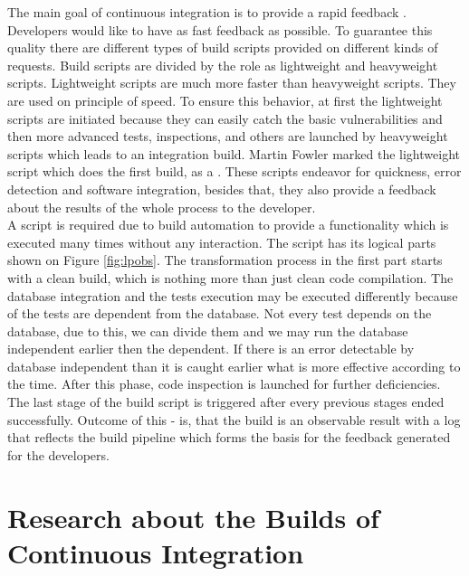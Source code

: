 The main goal of continuous integration is to provide a rapid feedback \cite{MartinFowler}. Developers would like to have as fast feedback as possible. To guarantee this quality there are different types of build scripts provided on different kinds of requests. Build scripts are divided by the role as lightweight and heavyweight scripts. Lightweight scripts are much more faster than heavyweight scripts. They are used on principle of speed. To ensure this behavior, at first the lightweight scripts are initiated because they can easily catch the basic vulnerabilities and then more advanced tests, inspections, and others are launched by heavyweight scripts which leads to an integration build. Martin Fowler marked the lightweight script which does the first build, as a  \cite{MartinFowler}. These scripts endeavor for quickness, error detection and software integration, besides that, they also provide a feedback about the results of the whole process to the developer.\\

A script is required due to build automation to provide a  functionality which is executed many times without any interaction. The script has its logical parts shown on Figure \ref{fig:lpobs}. The transformation process in the first part starts with a clean build, which is nothing more than just clean code compilation. The database integration and the tests execution may be executed differently because of the tests are dependent from the database. Not every test depends on the database, due to this, we can divide them and we may run the database independent earlier then the dependent. If there is an error detectable by database independent than it is caught earlier what is more effective according to the time. After this phase, code inspection is launched for further deficiencies. The last stage of the build script is triggered after every previous stages ended successfully. Outcome of this - is, that the build is an observable result with a log that reflects the build pipeline which forms the basis for the feedback generated for the developers.

\section{Research about the Builds of Continuous Integration}

